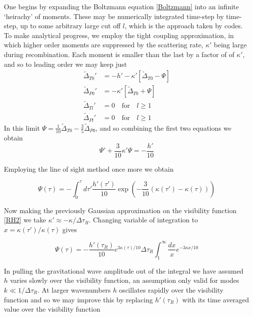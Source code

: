 \documentclass[a4paper,10pt]{article}
\begin{document}
One begins by expanding the Boltzmann equation \ref{Boltzmann} into an infinite `heirachy' of moments. These may be numerically integrated time-step by time-step, up to some arbitrary large cut off $l$, which is the approach taken by codes. To make analytical progress, we employ the tight coupling approximation, in which higher order moments are suppressed by the scattering rate, $\kappa'$ being large during recombination. Each moment is smaller than the last by a factor of of $\kappa'$, and so to leading order we may keep just	
\begin{equation}
\begin{split}
\tilde{\Delta}_{T0}'&=-h'-\kappa'[\tilde{\Delta}_{T0}-\Psi]\\
\tilde{\Delta}_{P0}'&=-\kappa'[\tilde{\Delta}_{T0}+\Psi]\\
\tilde{\Delta}_{Tl}'&=0\quad\text{for} \quad l\geq1\\
\tilde{\Delta}_{Pl}'&=0\quad\text{for} \quad l\geq1
\end{split}
\end{equation}
In this limit $\Psi = \frac{1}{10}\tilde{\Delta}_{T0} - \frac{3}{5}\tilde{\Delta}_{P0}$, and so combining the first two equations we obtain
\begin{equation}
\Psi ' +\frac{3}{10}\kappa'\Psi = -\frac{h'}{10}
\end{equation}

Employing the line of sight method once more we obtain

\begin{equation}
\Psi(\tau) = -\int_0^\tau d\tau' \frac{h'(\tau')}{10}\exp{\left( -\frac{3}{10}(\kappa(\tau')-\kappa(\tau))\right)}
\end{equation}

Now making the previously Gaussian approximation on the visibility function \ref{RH2} we take $\kappa'\approx -\kappa/\Delta\tau_R$. Changing variable of integration to $x=\kappa(\tau')/\kappa(\tau)$ gives

\begin{equation}
\Psi(\tau) = -\frac{h'(\tau_R)}{10}e^{3\kappa(\tau)/10}\Delta\tau_R\int_1^\infty\frac{dx}{x}e^{-3\kappa x/10}
\end{equation}

In pulling the gravitational wave amplitude out of the integral we have assumed $h$ varies slowly over the visibility function, an assumption only valid for modes $k\ll 1/\Delta\tau_R$. At larger wavenumbers $h$ oscillates rapidly over the visibility function and so we may improve this by replacing $h'(\tau_R)$ with its time averaged value over the visibility function
\end{document}
